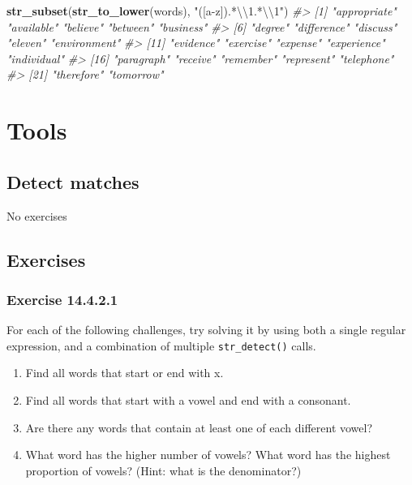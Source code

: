 \documentclass[]{book}
\newenvironment{Shaded}{\begin{snugshade}}{\end{snugshade}}
\newcommand{\CharTok}[1]{\textcolor[rgb]{0.31,0.60,0.02}{#1}}
\newcommand{\CommentTok}[1]{\textcolor[rgb]{0.56,0.35,0.01}{\textit{#1}}}
\newcommand{\KeywordTok}[1]{\textcolor[rgb]{0.13,0.29,0.53}{\textbf{#1}}}
\newcommand{\NormalTok}[1]{#1}
\newcommand{\StringTok}[1]{\textcolor[rgb]{0.31,0.60,0.02}{#1}}
\providecommand{\tightlist}{%
  \setlength{\itemsep}{0pt}\setlength{\parskip}{0pt}}
\theoremstyle{plain}
\theoremstyle{remark}
\theoremstyle{definition}
\theoremstyle{definition}
\theoremstyle{definition}
\theoremstyle{remark}
\begin{document}
\begin{enumerate}
\begin{Shaded}
\begin{Highlighting}[]
\KeywordTok{str_subset}\NormalTok{(}\KeywordTok{str_to_lower}\NormalTok{(words), }\StringTok{"([a-z]).*}\CharTok{\textbackslash{}\textbackslash{}}\StringTok{1.*}\CharTok{\textbackslash{}\textbackslash{}}\StringTok{1"}\NormalTok{)}
\CommentTok{#>  [1] "appropriate" "available"   "believe"     "between"     "business"   }
\CommentTok{#>  [6] "degree"      "difference"  "discuss"     "eleven"      "environment"}
\CommentTok{#> [11] "evidence"    "exercise"    "expense"     "experience"  "individual" }
\CommentTok{#> [16] "paragraph"   "receive"     "remember"    "represent"   "telephone"  }
\CommentTok{#> [21] "therefore"   "tomorrow"}
\end{Highlighting}
\end{Shaded}
\end{enumerate}

\hypertarget{tools}{%
\section{Tools}\label{tools}}

\hypertarget{detect-matches}{%
\subsection{Detect matches}\label{detect-matches}}

No exercises

\hypertarget{exercises-1}{%
\subsection{Exercises}\label{exercises-1}}

\hypertarget{exercise-14.4.2.1}{%
\subsubsection*{\texorpdfstring{Exercise
{14.4.2.1}}{Exercise 14.4.2.1}}\label{exercise-14.4.2.1}}

For each of the following challenges, try solving it by using both a
single regular expression, and a combination of multiple
\texttt{str\_detect()} calls.

\begin{enumerate}
\def\labelenumi{\arabic{enumi}.}
\tightlist
\item
  Find all words that start or end with x.
\item
  Find all words that start with a vowel and end with a consonant.
\item
  Are there any words that contain at least one of each different vowel?
\item
  What word has the higher number of vowels? What word has the highest
  proportion of vowels? (Hint: what is the denominator?)
\end{enumerate}
\end{document}
